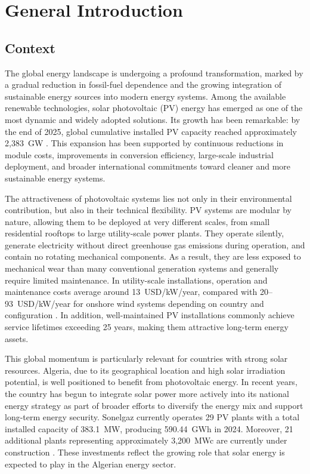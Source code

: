 \chapter*{General Introduction}
\label{ch:introduction}

\section*{Context}

The global energy landscape is undergoing a profound transformation, marked by a gradual reduction in fossil-fuel dependence and the growing integration of sustainable energy sources into modern energy systems. Among the available renewable technologies, solar photovoltaic (PV) energy has emerged as one of the most dynamic and widely adopted solutions. Its growth has been remarkable: by the end of 2025, global cumulative installed PV capacity reached approximately 2,383~GW \citep{irena2026}. This expansion has been supported by continuous reductions in module costs, improvements in conversion efficiency, large-scale industrial deployment, and broader international commitments toward cleaner and more sustainable energy systems.

The attractiveness of photovoltaic systems lies not only in their environmental contribution, but also in their technical flexibility. PV systems are modular by nature, allowing them to be deployed at very different scales, from small residential rooftops to large utility-scale power plants. They operate silently, generate electricity without direct greenhouse gas emissions during operation, and contain no rotating mechanical components. As a result, they are less exposed to mechanical wear than many conventional generation systems and generally require limited maintenance. In utility-scale installations, operation and maintenance costs average around 13~USD/kW/year, compared with 20--93~USD/kW/year for onshore wind systems depending on country and configuration \citep{irena_costs2025}. In addition, well-maintained PV installations commonly achieve service lifetimes exceeding 25 years, making them attractive long-term energy assets.

This global momentum is particularly relevant for countries with strong solar resources. Algeria, due to its geographical location and high solar irradiation potential, is well positioned to benefit from photovoltaic energy. In recent years, the country has begun to integrate solar power more actively into its national energy strategy as part of broader efforts to diversify the energy mix and support long-term energy security. Sonelgaz currently operates 29 PV plants with a total installed capacity of 383.1~MW, producing 590.44~GWh in 2024. Moreover, 21 additional plants representing approximately 3,200~MWc are currently under construction \citep{energygov2025}. These investments reflect the growing role that solar energy is expected to play in the Algerian energy sector.

